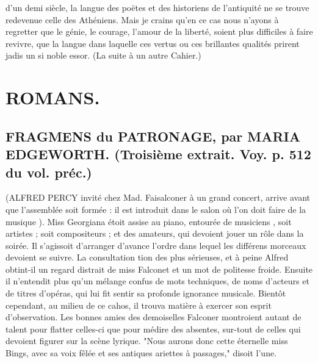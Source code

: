 \setcounter{page}{112} d'un demi siècle, la langue des poëtes et des historiens de l'antiquité ne se trouve redevenue celle des Athéniens. Mais je crains qu'en ce cas nous n'ayons à regretter que le génie, le courage, l'amour de la liberté, soient plus difficiles à faire revivre, que la langue dans laquelle ces vertus ou ces brillantes qualités prirent jadis un si noble essor.
\large{(La suite à un autre Cahier.)}
\chapter{ROMANS.}
\section{FRAGMENS du PATRONAGE, par MARIA EDGEWORTH. \large{(Troisième extrait. Voy. p. 512 du vol. préc.)}}
(ALFRED PERCY invité chez Mad. Faisalconer à un grand concert, arrive avant que l'assemblée soit formée : il est introduit dans le salon où l'on doit faire de la musique ). Miss Georgiana étoit assise au piano, entourée de musiciens , soit artistes ; soit compositeurs ; et des amateurs, qui devoient jouer un rôle dans la soirée. Il s'agissoit d'arranger d'avance l'ordre dans lequel les différens morceaux devoient se suivre. La consultation\setcounter{page}{113} tion des plus sérieuses, et à peine Alfred obtint-il un regard distrait de miss Falconet et un mot de politesse froide. Ensuite il n’entendit plus qu’un mélange confus de mots techniques, de noms d’acteurs et de titres d’opéras, qui lui fit sentir sa profonde ignorance musicale. Bientôt cependant, au milieu de ce cahos, il trouva matière à exercer son esprit d’observation. Les bonnes amies des demoiselles Falconer montroient autant de talent pour flatter celles-ci que pour médire des absentes, sur-tout de celles qui devoient figurer sur la scène lyrique.
"Nous aurons donc cette éternelle miss Bings, avec sa voix fêlée et ses antiques ariettes à passages," disoit l’une.
